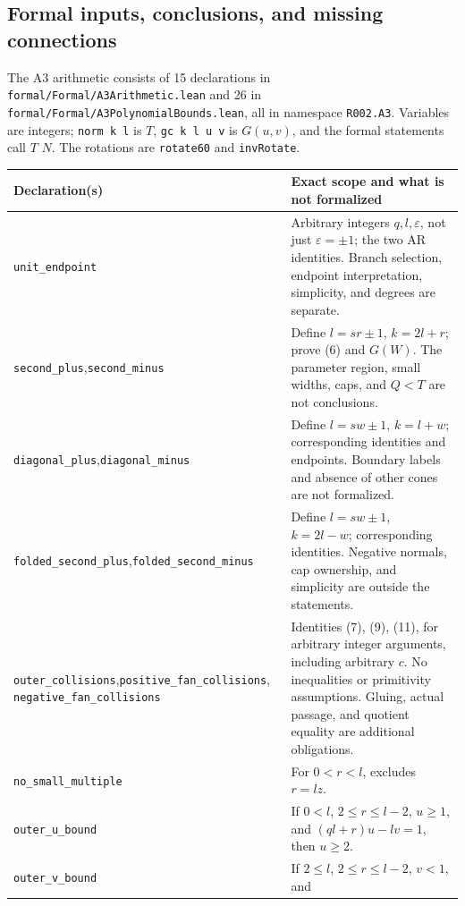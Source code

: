 \documentclass[11pt]{amsart}
\newcommand{\record}[1]{\nolinkurl{#1}}
\begin{document}
\subsection{Formal inputs, conclusions, and missing connections}
The A3 arithmetic consists of 15 declarations in
\record{formal/Formal/A3Arithmetic.lean} and 26 in
\record{formal/Formal/A3PolynomialBounds.lean}, all in namespace
\record{R002.A3}. Variables are integers; \texttt{norm k l} is $T$,
\texttt{gc k l u v} is $G(u,v)$, and the formal statements call $T$
$N$. The rotations are \record{rotate60} and \record{invRotate}.
\begin{longtable}{>{\raggedright\arraybackslash}p{}>{\raggedright\arraybackslash}p{}}
\toprule Declaration(s) & Exact scope and what is not formalized\\\midrule\endhead
\record{unit_endpoint} & Arbitrary integers $q,l,\varepsilon$, not just
$\varepsilon=\pm1$; the two AR identities. Branch selection, endpoint
interpretation, simplicity, and degrees are separate.\\
\record{second_plus},\newline \record{second_minus} & Define $l=sr\pm1$, $k=2l+r$;
prove (6) and $G(W)$. The parameter region, small widths, caps, and
$Q<T$ are not conclusions.\\
\record{diagonal_plus},\newline \record{diagonal_minus} & Define $l=sw\pm1$,
$k=l+w$; corresponding identities and endpoints. Boundary labels and
absence of other cones are not formalized.\\
\record{folded_second_plus},\newline \record{folded_second_minus} & Define
$l=sw\pm1$, $k=2l-w$; corresponding identities. Negative normals,
cap ownership, and simplicity are outside the statements.\\
\record{outer_collisions},\newline \record{positive_fan_collisions},\newline
\record{negative_fan_collisions} & Identities (7), (9), (11), for arbitrary
integer arguments, including arbitrary $c$. No inequalities or
primitivity assumptions. Gluing, actual passage, and quotient equality
are additional obligations.\\
\record{no_small_multiple} & For $0<r<l$, excludes $r=lz$.\\
\record{outer_u_bound} & If $0<l$, $2\le r\le l-2$, $u\ge1$, and
$(ql+r)u-lv=1$, then $u\ge2$.\\
\record{outer_v_bound} & If $2\le l$, $2\le r\le l-2$, $v<1$, and

\end{longtable}
\end{document}
